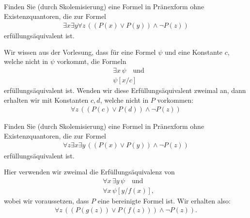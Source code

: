 
\begin{exercise}[173]
Finden Sie (durch Skolemisierung) eine Formel in Pränexform ohne Existenzquantoren,
die zur Formel
\begin{align*}
  \exists x \exists y \forall z\, ((P(x) \lor P(y))\land \neg P(z))
\end{align*}
erfüllungsäquivalent ist.
\end{exercise}


\begin{solution}
Wir wissen aus der Vorlesung, dass für eine Formel $\psi$ und eine Konstante $c$,
welche nicht in $\psi$ vorkommt, die Formeln
\begin{align*}
  &\exists x\, \psi \quad \text{und}\\
  &\psi[x/c]
\end{align*}
erfüllungsäquivalent ist. Wenden wir diese Erfüllungsäquivalent zweimal an,
dann erhalten wir mit Konstanten $c,d$, welche nicht in $P$ vorkommen:
\begin{align*}
  \forall z\, ((P(c) \lor P(d))\land \neg P(z))
\end{align*}
\end{solution}



\begin{exercise}[174]
Finden Sie (durch Skolemisierung) eine Formel in Pränexform ohne Existenzquantoren,
die zur Formel
\begin{align*}
  \forall z \exists x \exists y \, ((P(x) \lor P(y))\land \neg P(z))
\end{align*}
erfüllungsäquivalent ist.
\end{exercise}


\begin{solution}
Hier verwenden wir zweimal die Erfüllungsäquivalenz von
\begin{align*}
  &\forall x\, \exists y\, \psi \quad \text{und} \\
  &\forall x\, \psi[y/f(x)],
\end{align*}
wobei wir voraussetzen, dass $P$ eine bereinigte Formel ist. Wir erhalten also:
\begin{align*}
  \forall z \, ((P(g(z)) \lor P(f(z)))\land \neg P(z)).
\end{align*}
\end{solution}

